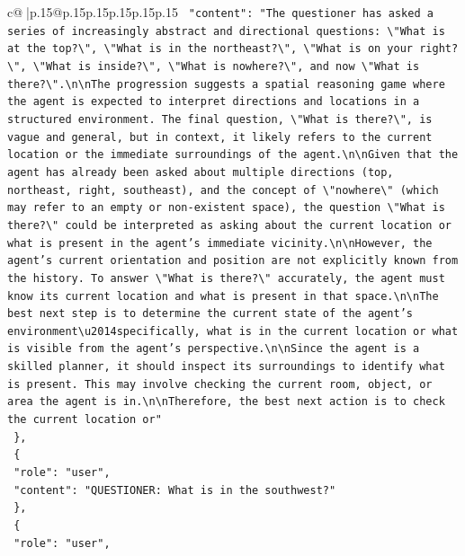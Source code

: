 \documentclass{article}
\begin{document}
{\begin{supertabular}{c@{$\;$}|p{.15\linewidth}@{}p{.15\linewidth}p{.15\linewidth}p{.15\linewidth}p{.15\linewidth}p{.15\linewidth}}
{{{\texttt{    "content": "The questioner has asked a series of increasingly abstract and directional questions: \textbackslash{}"What is at the top?\textbackslash{}", \textbackslash{}"What is in the northeast?\textbackslash{}", \textbackslash{}"What is on your right?\textbackslash{}", \textbackslash{}"What is inside?\textbackslash{}", \textbackslash{}"What is nowhere?\textbackslash{}", and now \textbackslash{}"What is there?\textbackslash{}".\textbackslash{}n\textbackslash{}nThe progression suggests a spatial reasoning game where the agent is expected to interpret directions and locations in a structured environment. The final question, \textbackslash{}"What is there?\textbackslash{}", is vague and general, but in context, it likely refers to the current location or the immediate surroundings of the agent.\textbackslash{}n\textbackslash{}nGiven that the agent has already been asked about multiple directions (top, northeast, right, southeast), and the concept of \textbackslash{}"nowhere\textbackslash{}" (which may refer to an empty or non{-}existent space), the question \textbackslash{}"What is there?\textbackslash{}" could be interpreted as asking about the current location or what is present in the agent's immediate vicinity.\textbackslash{}n\textbackslash{}nHowever, the agent's current orientation and position are not explicitly known from the history. To answer \textbackslash{}"What is there?\textbackslash{}" accurately, the agent must know its current location and what is present in that space.\textbackslash{}n\textbackslash{}nThe best next step is to determine the current state of the agent's environment\textbackslash{}u2014specifically, what is in the current location or what is visible from the agent's perspective.\textbackslash{}n\textbackslash{}nSince the agent is a skilled planner, it should inspect its surroundings to identify what is present. This may involve checking the current room, object, or area the agent is in.\textbackslash{}n\textbackslash{}nTherefore, the best next action is to check the current location or"} \\
\texttt{  \},} \\
\texttt{  \{} \\
\texttt{    "role": "user",} \\
\texttt{    "content": "QUESTIONER: What is in the southwest?"} \\
\texttt{  \},} \\
\texttt{  \{} \\
\texttt{    "role": "user",} \\
}}}
\end{supertabular}}
\end{document}
